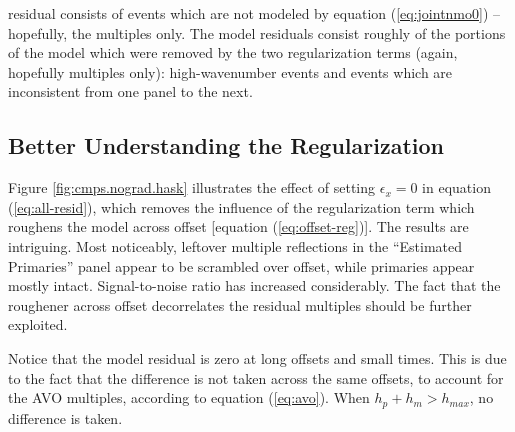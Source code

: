 residual consists of events which are not modeled by equation (\ref{eq:jointnmo0}) -- hopefully,
 the multiples only.  The model residuals consist roughly of the portions of the model which 
were removed by the two regularization terms (again, hopefully multiples only): high-wavenumber 
events and events which are inconsistent from one panel to the next.  

\subsection{Better Understanding the Regularization}
Figure \ref{fig:cmps.nograd.hask} illustrates the effect of setting $\epsilon_x=0$ in equation
(\ref{eq:all-resid}), which removes the influence of the regularization term which roughens
the model across offset [equation (\ref{eq:offset-reg})].  The results are intriguing.  Most
noticeably, leftover multiple reflections in the ``Estimated Primaries'' panel appear to be 
scrambled over offset, while primaries appear mostly intact.  Signal-to-noise ratio has increased
considerably.  The fact that the roughener across offset decorrelates the residual multiples should 
be further exploited.
\par
Notice that the model residual is zero at long offsets and small times.  This is due to the fact that
the difference is not taken across the same offsets, to account for the AVO multiples, according to
equation (\ref{eq:avo}).  When $h_p + h_m > h_{max}$, no difference is taken. 

